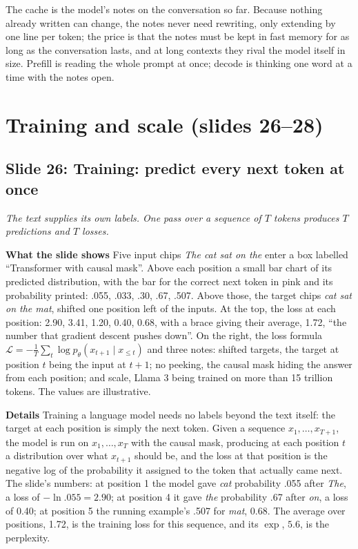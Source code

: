 \documentclass[11pt,letterpaper]{article}
\newcommand{\setstage}[1]{\colorlet{stagec}{#1}}
\newcommand{\slide}[3]{%
  \subsection[Slide #1: #2]{Slide #1: #2}%
  {\color{muted}\itshape #3\par}\medskip}
\newcommand{\para}[1]{\medskip\noindent\textbf{#1}\quad}
\newenvironment{intuition}{\begin{tcolorbox}[intuitionbox]}{\end{tcolorbox}}
\begin{document}
\begin{intuition}
The cache is the model's notes on the conversation so far. Because nothing already written can change, the notes never need rewriting, only extending by one line per token; the price is that the notes must be kept in fast memory for as long as the conversation lasts, and at long contexts they rival the model itself in size. Prefill is reading the whole prompt at once; decode is thinking one word at a time with the notes open.
\end{intuition}

\setstage{trn}
\section{Training and scale (slides 26--28)}

\slide{26}{Training: predict every next token at once}{The text supplies its own labels. One pass over a sequence of $T$ tokens produces $T$ predictions and $T$ losses.}

\para{What the slide shows} Five input chips \emph{The cat sat on the} enter a box labelled ``Transformer with causal mask''. Above each position a small bar chart of its predicted distribution, with the bar for the correct next token in pink and its probability printed: .055, .033, .30, .67, .507. Above those, the target chips \emph{cat sat on the mat}, shifted one position left of the inputs. At the top, the loss at each position: 2.90, 3.41, 1.20, 0.40, 0.68, with a brace giving their average, 1.72, ``the number that gradient descent pushes down''. On the right, the loss formula $\mathcal{L}=-\frac1T\sum_t\log p_\theta(x_{t+1}\mid x_{\le t})$ and three notes: shifted targets, the target at position $t$ being the input at $t+1$; no peeking, the causal mask hiding the answer from each position; and scale, Llama 3 being trained on more than 15 trillion tokens. The values are illustrative.

\para{Details} Training a language model needs no labels beyond the text itself: the target at each position is simply the next token. Given a sequence $x_1,\dots,x_{T+1}$, the model is run on $x_1,\dots,x_T$ with the causal mask, producing at each position $t$ a distribution over what $x_{t+1}$ should be, and the loss at that position is the negative log of the probability it assigned to the token that actually came next. The slide's numbers: at position 1 the model gave \emph{cat} probability .055 after \emph{The}, a loss of $-\ln.055=2.90$; at position 4 it gave \emph{the} probability .67 after \emph{on}, a loss of 0.40; at position 5 the running example's .507 for \emph{mat}, 0.68. The average over positions, 1.72, is the training loss for this sequence, and its $\exp$, $5.6$, is the perplexity.
\end{document}
